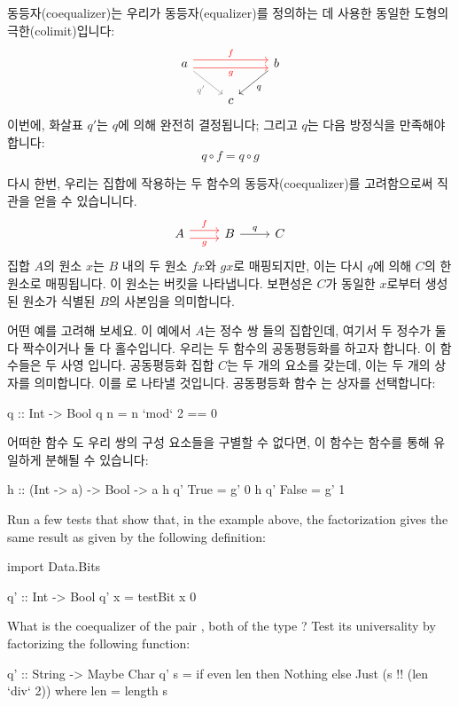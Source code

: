\documentclass[DaoFP]{subfiles}
\begin{document}
동등자(coequalizer)는 우리가 동등자(equalizer)를 정의하는 데 사용한 동일한 도형의 극한(colimit)입니다:
\[
\begin{tikzcd}
a 
\arrow[rr, red, shift left=.75ex, "f"]
\arrow[rr, red, shift right=.75ex, "g"']
\arrow[rd, gray, "q'"']
&&
b
\arrow[ld, "q"]
\\
& c
\end{tikzcd}
\]
이번에, 화살표 $q'$는 $q$에 의해 완전히 결정됩니다; 그리고 $q$는 다음 방정식을 만족해야 합니다:
\[ q \circ f = q \circ g \]

다시 한번, 우리는 집합에 작용하는 두 함수의 동등자(coequalizer)를 고려함으로써 직관을 얻을 수 있습니니다.
\[
\begin{tikzcd}
A
\arrow[r, red, shift left=.75ex, "f"]
\arrow[r, red, shift right=.75ex, "g"']
&
B
\arrow[r, "q"]
& C
\end{tikzcd}
\]
집합 $A$의 원소 $x$는 $B$ 내의 두 원소 $f x$와 $g x$로 매핑되지만, 이는 다시 $q$에 의해 $C$의 한 원소로 매핑됩니다. 이 원소는 버킷을 나타냅니다. 보편성은 $C$가 동일한 $x$로부터 생성된 원소가 식별된 $B$의 사본임을 의미합니다.

어떤 예를 고려해 보세요. 이 예에서 $A$는 정수 쌍 들의 집합인데, 여기서 두 정수가 둘 다 짝수이거나 둘 다 홀수입니다. 우리는 두 함수의 공동평등화를 하고자 합니다. 이 함수들은 두 사영 입니다. 공동평등화 집합 $C$는 두 개의 요소를 갖는데, 이는 두 개의 상자를 의미합니다. 이를 로 나타낼 것입니다. 공동평등화 함수 는 상자를 선택합니다:
\begin{haskell}
q :: Int -> Bool
q n = n `mod` 2 == 0 
\end{haskell}
어떠한 함수 도 우리 쌍의 구성 요소들을 구별할 수 없다면, 이 함수는  함수를 통해 유일하게 분해될 수 있습니다:
\begin{haskell}
h :: (Int -> a) -> Bool -> a
h q' True  = g' 0
h q' False = g' 1
\end{haskell}

\begin{exercise}
Run a few tests that show that, in the example above, the factorization  gives the same result as  given by the following definition:
\begin{haskell}
import Data.Bits

q' :: Int -> Bool
q' x = testBit x 0
\end{haskell}

\end{exercise}
\begin{exercise}
What is the coequalizer of the pair , both of the type ? Test its universality by factorizing the following function:
\begin{haskell}
q' :: String -> Maybe Char
q' s = if even len
       then Nothing
       else Just (s !! (len `div` 2))
  where len = length s
\end{haskell}
\end{exercise}
\end{document}

